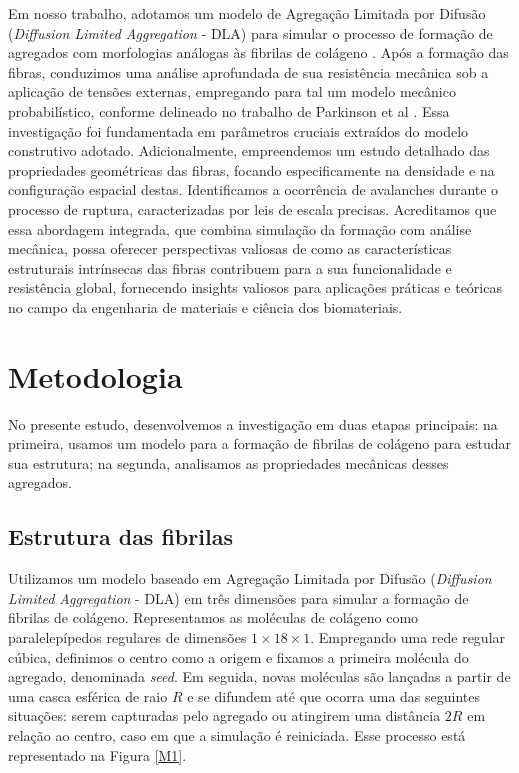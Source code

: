 \documentclass{article}
\begin{document}
    Em nosso trabalho, adotamos um modelo de Agregação Limitada por Difusão (\textit{Diffusion Limited Aggregation} - DLA) para simular 
    o processo de formação de agregados com morfologias análogas às fibrilas de colágeno \cite{Parkinson1995}. Após a formação das fibras, 
    conduzimos uma análise aprofundada de sua resistência mecânica sob a aplicação de tensões externas, empregando para tal um modelo mecânico 
    probabilístico, conforme delineado no trabalho de Parkinson et al \cite{Parkinson1997}. Essa investigação foi fundamentada em parâmetros 
    cruciais extraídos do modelo construtivo adotado. Adicionalmente, empreendemos um estudo detalhado das propriedades geométricas das fibras, 
    focando especificamente na densidade e na configuração espacial destas. Identificamos a ocorrência de avalanches durante o processo de ruptura, 
    caracterizadas por leis de escala precisas. Acreditamos que essa abordagem integrada, que combina simulação da formação com análise mecânica, possa 
    oferecer perspectivas valiosas de como as características estruturais intrínsecas das fibras contribuem para a sua funcionalidade e resistência 
    global, fornecendo insights valiosos para aplicações práticas e teóricas no campo da engenharia de materiais e ciência dos biomateriais.

\section{Metodologia}

    No presente estudo, desenvolvemos a investigação em duas etapas principais: na primeira, usamos um modelo para a formação de 
    fibrilas de colágeno para estudar sua estrutura; na segunda, analisamos as propriedades mecânicas desses agregados. 

    \subsection{Estrutura das fibrilas}

    Utilizamos um modelo baseado em Agregação Limitada por Difusão (\textit{Diffusion Limited Aggregation} - DLA) \cite{Witten1983} 
    em três dimensões para simular a formação de fibrilas de colágeno. Representamos as moléculas de colágeno como paralelepípedos 
    regulares de dimensões \(1 \times 18 \times 1\). Empregando uma rede regular cúbica, definimos o centro como a origem e fixamos 
    a primeira molécula do agregado, denominada \textit{seed}. Em seguida, novas moléculas são lançadas a partir de uma casca esférica
    de raio \(R\) e se difundem até que ocorra uma das seguintes situações: serem capturadas pelo agregado ou atingirem uma distância 
    \(2R\) em relação ao centro, caso em que a simulação é reiniciada. Esse processo está representado na Figura \ref{M1}. 
\end{document}
